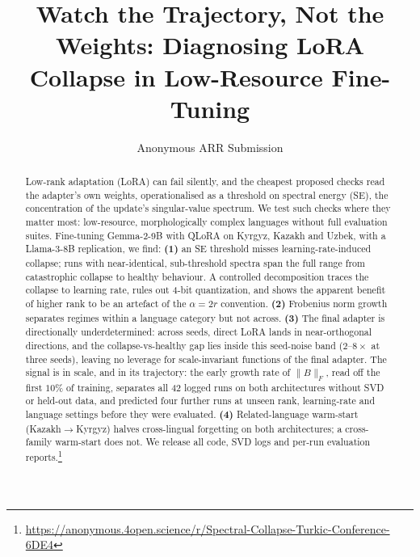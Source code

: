 \documentclass[11pt]{article}
\title{Watch the Trajectory, Not the Weights: Diagnosing LoRA Collapse in Low-Resource Fine-Tuning}
\author{Anonymous ARR Submission}
\begin{document}
\pagestyle{empty}            %
\thispagestyle{empty}
\nolinenumbers               %
\maketitle
\thispagestyle{empty}

\begin{abstract}
Low-rank adaptation (LoRA) can fail silently, and the cheapest proposed checks read the adapter's own weights, operationalised as a threshold on spectral energy (SE), the concentration of the update's singular-value spectrum. We test such checks where they matter most: low-resource, morphologically complex languages without full evaluation suites. Fine-tuning Gemma-2-9B with QLoRA on Kyrgyz, Kazakh and Uzbek, with a Llama-3-8B replication, we find: \textbf{(1)} an SE threshold misses learning-rate-induced collapse; runs with near-identical, sub-threshold spectra span the full range from catastrophic collapse to healthy behaviour. A controlled decomposition traces the collapse to learning rate, rules out 4-bit quantization, and shows the apparent benefit of higher rank to be an artefact of the $\alpha{=}2r$ convention. \textbf{(2)} Frobenius norm growth separates regimes within a language category but not across. \textbf{(3)} The final adapter is directionally underdetermined: across seeds, direct LoRA lands in near-orthogonal directions, and the collapse-vs-healthy gap lies inside this seed-noise band ($2$--$8\times$ at three seeds), leaving no leverage for scale-invariant functions of the final adapter. The signal is in scale, and in its trajectory: the early growth rate of $\|B\|_F$, read off the first $10\%$ of training, separates all 42 logged runs on both architectures without SVD or held-out data, and predicted four further runs at unseen rank, learning-rate and language settings before they were evaluated. \textbf{(4)} Related-language warm-start (Kazakh$\rightarrow$Kyrgyz) halves cross-lingual forgetting on both architectures; a cross-family warm-start does not. We release all code, SVD logs and per-run evaluation reports.\footnote{\label{fn:repo}{\small\url{https://anonymous.4open.science/r/Spectral-Collapse-Turkic-Conference-6DE4}}}
\end{abstract}
\end{document}
